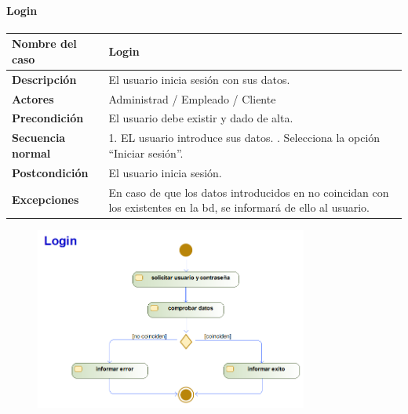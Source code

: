 \paragraph{Login}
\begin{table}[H]
	\centering
	\small
	\begin{tabularx}{0.8\textwidth}{|p{3.5cm}|X|}
		\hline
		\rowcolor{lightgray}
		\textbf{Nombre del caso}  & \textbf{Login}                                                                                                            \\
		\hline
		\textbf{Descripción}      & El usuario inicia sesión con sus datos.                                                                                   \\
		\hline
		\textbf{Actores}          & Administrad / Empleado / Cliente                                                                                          \\
		\hline
		\textbf{Precondición}     & El usuario debe existir y dado de alta.                                                                                   \\
		\hline
		\textbf{Secuencia normal} & 1. EL usuario introduce sus datos. \newline
		2. Selecciona la opción ``Iniciar sesión''. \newline                                                                                                  \\
		\hline
		\textbf{Postcondición}    & El usuario inicia sesión.                                                                                                 \\
		\hline
		\textbf{Excepciones}      & En caso de que los datos introducidos en no coincidan con los existentes en la \gls{bd}, se informará de ello al usuario. \\
		\hline
	\end{tabularx}
\end{table}
\begin{figure}[H]
	\centering
	\includegraphics[width=0.8\textwidth]{Use_Cases/login.png}
\end{figure}
\newpage
